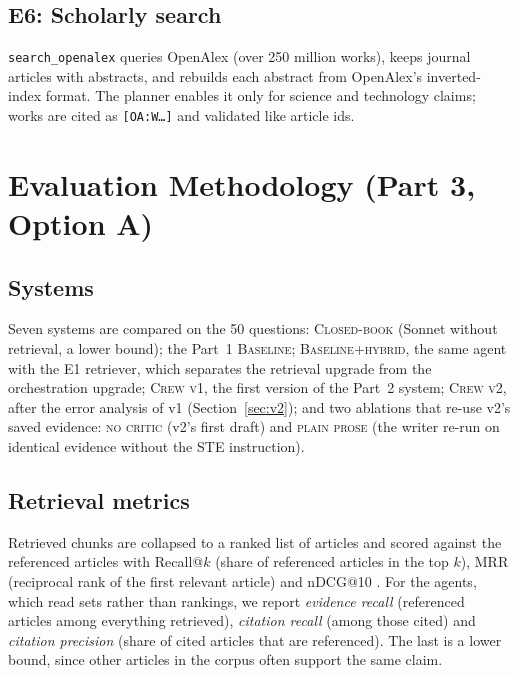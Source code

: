 \documentclass[conference]{IEEEtran}
\newcommand{\sys}[1]{\textsc{#1}}
\begin{document}
\subsection{E6: Scholarly search}
\texttt{search\_openalex} queries OpenAlex (over 250 million works), keeps journal articles with abstracts,
and rebuilds each abstract from OpenAlex's inverted-index format. The planner enables it only for science
and technology claims; works are cited as \texttt{[OA:W\ldots]} and validated like article ids.

\section{Evaluation Methodology (Part 3, Option A)}
\subsection{Systems}
Seven systems are compared on the 50 questions: \sys{Closed-book} (Sonnet without retrieval, a lower
bound); the Part~1 \sys{Baseline}; \sys{Baseline+hybrid}, the same agent with the E1 retriever, which
separates the retrieval upgrade from the orchestration upgrade; \sys{Crew v1}, the first version of the
Part~2 system; \sys{Crew v2}, after the error analysis of v1 (Section~\ref{sec:v2}); and two ablations that
re-use v2's saved evidence: \sys{no critic} (v2's first draft) and \sys{plain prose} (the writer re-run on
identical evidence without the STE instruction).

\subsection{Retrieval metrics}
Retrieved chunks are collapsed to a ranked list of articles and scored against the referenced articles
with Recall@$k$ (share of referenced articles in the top $k$), MRR (reciprocal rank of the first relevant
article) and nDCG@10 \cite{jarvelin2002ndcg}. For the agents, which read sets rather than rankings, we report
\emph{evidence recall} (referenced articles among everything retrieved), \emph{citation recall} (among
those cited) and \emph{citation precision} (share of cited articles that are referenced). The last is a lower
bound, since other articles in the corpus often support the same claim.
\end{document}

